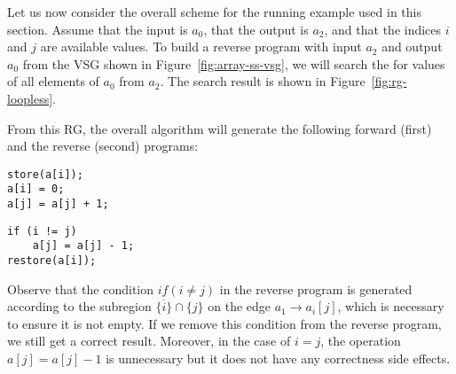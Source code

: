 Let us now consider the overall scheme for the running example used in this section.
Assume that the input is $a_0$, that the output is $a_2$, and that the indices $i$ and $j$ are available values.
To build a reverse program with input $a_2$ and output $a_0$ from the VSG shown in Figure~\ref{fig:array-ss-vsg}, we will search the for values of all elements of $a_0$ from $a_2$. 
The search result is shown in Figure~\ref{fig:rg-loopless}.



From this RG, the overall algorithm will generate the following forward (first) and the reverse (second) programs:


\begin{lstlisting}
store(a[i]);
a[i] = 0;
a[j] = a[j] + 1;
\end{lstlisting}


\begin{lstlisting}
if (i != j)
    a[j] = a[j] - 1;
restore(a[i]);
\end{lstlisting}

%
Observe that the condition $if(i\ne j)$ in the reverse program is generated according to the subregion $\overline{\{i\}}\cap\{j\}$ on the edge $a_1\to a_i[j]$, which is necessary to ensure it is not empty.
If we remove this condition  from the reverse program, we still get a correct result.
Moreover, in the case of $i=j$, the operation $a[j] = a[j] - 1$ is unnecessary but it does not have any correctness side effects.


